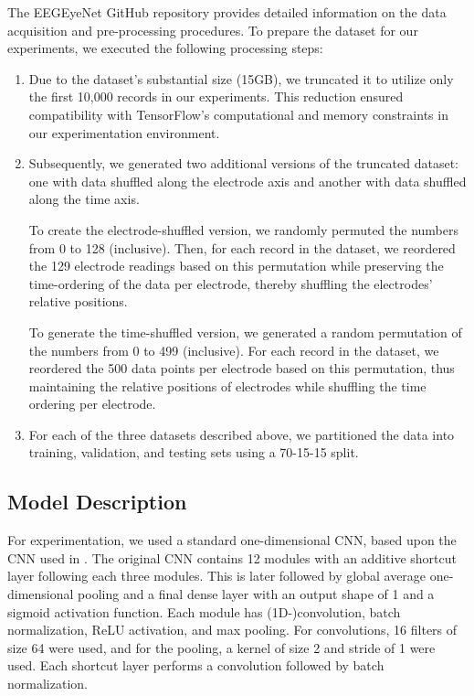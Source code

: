\documentclass[11pt]{article}
\begin{document}
The EEGEyeNet GitHub repository \parencite{code} provides detailed information on the data acquisition and pre-processing procedures. To prepare the dataset for our experiments, we executed the following processing steps:

\begin{enumerate}
    \item Due to the dataset's substantial size (15GB), we truncated it to utilize only the first 10,000 records in our experiments. This reduction ensured compatibility with TensorFlow's computational and memory constraints in our experimentation environment.
    
    \item Subsequently, we generated two additional versions of the truncated dataset: one with data shuffled along the electrode axis and another with data shuffled along the time axis.

    To create the electrode-shuffled version, we randomly permuted the numbers from 0 to 128 (inclusive). Then, for each record in the dataset, we reordered the 129 electrode readings based on this permutation while preserving the time-ordering of the data per electrode, thereby shuffling the electrodes' relative positions.

    To generate the time-shuffled version, we generated a random permutation of the numbers from 0 to 499 (inclusive). For each record in the dataset, we reordered the 500 data points per electrode based on this permutation, thus maintaining the relative positions of electrodes while shuffling the time ordering per electrode.

    \item For each of the three datasets described above, we partitioned the data into training, validation, and testing sets using a 70-15-15 split.
    
\end{enumerate}


\subsection{Model Description}

For experimentation, we used a standard one-dimensional CNN, based upon the CNN used in \cite{eegeyenet}. The original CNN contains 12 modules with an additive shortcut layer following each three modules. This is later followed by global average one-dimensional pooling and a final dense layer with an output shape of 1 and a sigmoid activation function. Each module has (1D-)convolution, batch normalization, ReLU activation, and max pooling. For convolutions, 16 filters of size 64 were used, and for the pooling, a kernel of size 2 and stride of 1 were used. Each shortcut layer performs a convolution followed by batch normalization.
\end{document}

